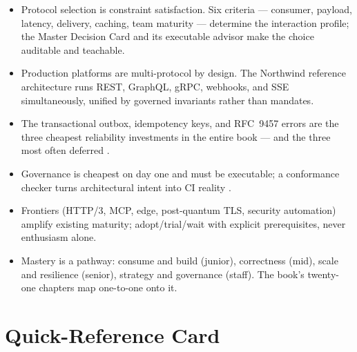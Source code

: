 \begin{itemize}
  \item Protocol selection is constraint satisfaction. Six criteria ---
        consumer, payload, latency, delivery, caching, team maturity ---
        determine the interaction profile; the Master Decision Card and its
        executable advisor make the choice auditable and teachable.
  \item Production platforms are multi-protocol by design. The Northwind
        reference architecture runs REST, GraphQL, gRPC, webhooks, and SSE
        simultaneously, unified by governed invariants rather than mandates.
  \item The transactional outbox, idempotency keys, and RFC~9457 errors are
        the three cheapest reliability investments in the entire book ---
        and the three most often deferred \cite{kleppmann2017ddia,rfc9457}.
  \item Governance is cheapest on day one and must be executable; a
        conformance checker turns architectural intent into CI reality
        \cite{openapi31,asyncapi}.
  \item Frontiers (HTTP/3, MCP, edge, post-quantum TLS, security automation)
        amplify existing maturity; adopt/trial/wait with explicit
        prerequisites, never enthusiasm alone.
  \item Mastery is a pathway: consume and build (junior), correctness
        (mid), scale and resilience (senior), strategy and governance
        (staff). The book's twenty-one chapters map one-to-one onto it.
\end{itemize}

\section{Quick-Reference Card}

